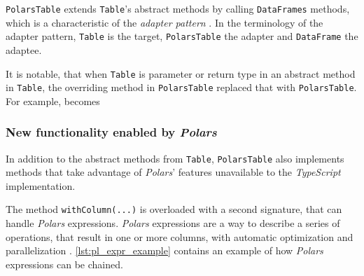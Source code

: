 \Verb|PolarsTable| extends \Verb|Table|'s abstract methods by calling \Verb|DataFrames| methods, which is a characteristic of the \emph{adapter pattern} \autocite{Dooley2024}.
In the terminology of the adapter pattern, \Verb|Table| is the target, \Verb|PolarsTable| the adapter and \Verb|DataFrame| the adaptee.

It is notable, that when \Verb|Table| is parameter or return type in an abstract method in \Verb|Table|, the overriding method in \Verb|PolarsTable| replaced that with \Verb|PolarsTable|.
For example,
becomes

\subsubsection{New functionality enabled by \emph{Polars}}
In addition to the abstract methods from \Verb|Table|, \Verb|PolarsTable| also implements methods that take advantage of \emph{Polars}' features unavailable to the \emph{TypeScript} implementation.

The method \Verb|withColumn(...)| is overloaded with a second signature, that can handle \emph{Polars} expressions.
\emph{Polars} expressions are a way to describe a series of operations, that result in one or more columns, with automatic optimization and parallelization \autocite{polars:docs:expr}.
\autoref{lst:pl_expr_example} contains an example of how \emph{Polars} expressions can be chained.


